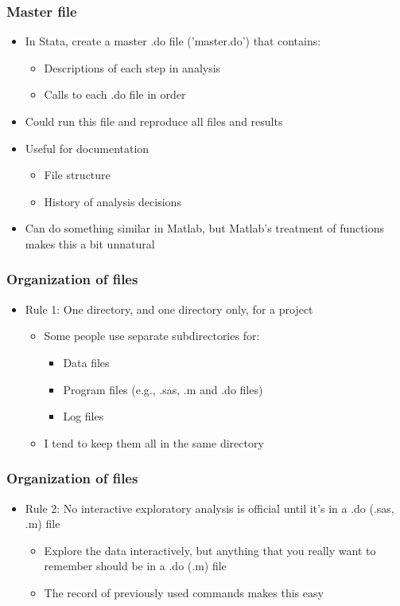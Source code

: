 \documentclass[english,xcolor=dvipsnames]{beamer}
\newcommand{\bi}{\begin{itemize}}
\newcommand{\ei}{\end{itemize}}
\begin{document}
\begin{frame}
\frametitle{Master file}

   \bi 
   \item In Stata, create a master .do file ('master.do') that contains:
      \bi 
      \item Descriptions of each step in analysis
      \item Calls to each .do file in order
      \ei
   \item Could run this file and reproduce all files and results
   \item Useful for documentation
      \bi 
      \item File structure
      \item History of analysis decisions
      \ei
   \item Can do something similar in Matlab, but Matlab's treatment of functions makes this a bit unnatural
   \ei
\end{frame}

\begin{frame}
\frametitle{Organization of files}

   \bi 
   \item Rule 1: One directory, and one directory only, for a project
      \bi 
      \item Some people use separate subdirectories for:
         \bi 
         \item Data files
         \item Program files (e.g., .sas, .m and .do files)
         \item Log files
         \ei
      \item I tend to keep them all in the same directory
      \ei
   \ei
\end{frame}

\begin{frame}
\frametitle{Organization of files}

   \bi 
   \item Rule 2: No interactive exploratory analysis is official until it's in a .do (.sas, .m) file
      \bi 
      \item Explore the data interactively, but anything that you really want to remember should be in a .do (.m) file
      \item The record of previously used commands makes this easy
      \ei
   \ei
\end{frame}
\end{document}
